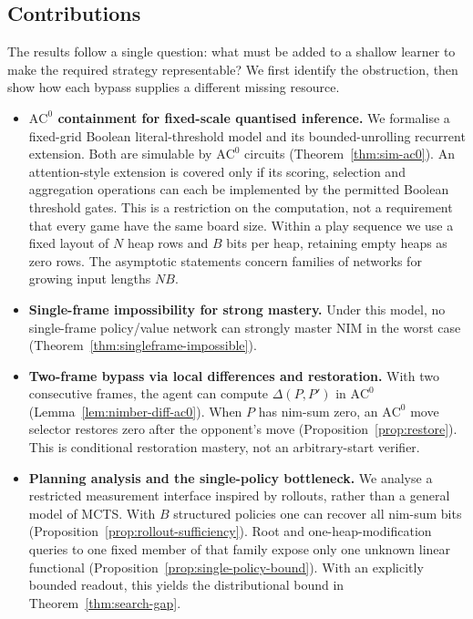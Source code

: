 \documentclass[11pt]{article}
\newcommand{\AC}{\mathrm{AC}}
\theoremstyle{plain}
\theoremstyle{definition}
\theoremstyle{remark}
\numberwithin{equation}{section}
\begin{document}
\subsection{Contributions}
\label{sec:contrib}

The results follow a single question: what must be added to a shallow learner to make the required strategy representable? We first identify the obstruction, then show how each bypass supplies a different missing resource.

\begin{itemize}[leftmargin=*]
\item \textbf{$\AC^0$ containment for fixed-scale quantised inference.}
We formalise a fixed-grid Boolean literal-threshold model and its bounded-unrolling recurrent extension. Both are simulable by $\AC^0$ circuits (Theorem~\ref{thm:sim-ac0}). An attention-style extension is covered only if its scoring, selection and aggregation operations can each be implemented by the permitted Boolean threshold gates. This is a restriction on the computation, not a requirement that every game have the same board size. Within a play sequence we use a fixed layout of $N$ heap rows and $B$ bits per heap, retaining empty heaps as zero rows. The asymptotic statements concern families of networks for growing input lengths $NB$.

\item \textbf{Single-frame impossibility for strong mastery.}
Under this model, no single-frame policy/value network can strongly master NIM in the worst case (Theorem~\ref{thm:singleframe-impossible}).

\item \textbf{Two-frame bypass via local differences and restoration.}
With two consecutive frames, the agent can compute $\Delta(P,P')$ in $\AC^0$ (Lemma~\ref{lem:nimber-diff-ac0}). When $P$ has nim-sum zero, an $\AC^0$ move selector restores zero after the opponent's move (Proposition~\ref{prop:restore}). This is conditional restoration mastery, not an arbitrary-start verifier.

\item \textbf{Planning analysis and the single-policy bottleneck.}
We analyse a restricted measurement interface inspired by rollouts, rather than a general model of MCTS.
With $B$ structured policies one can recover all nim-sum bits (Proposition~\ref{prop:rollout-sufficiency}). Root and one-heap-modification queries to one fixed member of that family expose only one unknown linear functional (Proposition~\ref{prop:single-policy-bound}). With an explicitly bounded readout, this yields the distributional bound in Theorem~\ref{thm:search-gap}.


\end{itemize}
\end{document}
